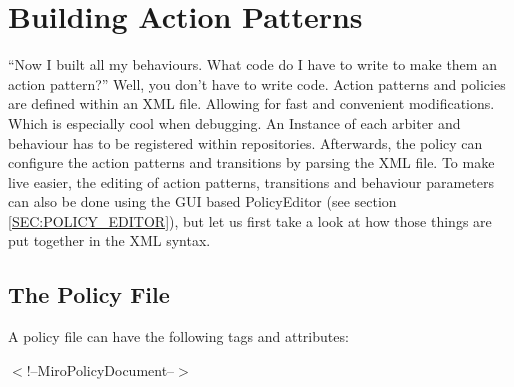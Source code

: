 \section{Building Action Patterns}

``Now I built all my behaviours. What code do I have to write to make
them an action pattern?'' Well, you don't have to write code. Action
patterns and policies are defined within an XML file. Allowing for
fast and convenient modifications. Which is especially cool when
debugging. An Instance of each arbiter and behaviour has to be
registered within repositories. Afterwards, the policy can configure
the action patterns and transitions by parsing the XML file. 
To make live easier, the editing of action patterns, transitions and
behaviour parameters can also be done using the GUI based PolicyEditor
(see section \ref{SEC:POLICY_EDITOR}), but
let us first take a look at how those things are put together in the
XML syntax.

\subsection{The Policy File}

A policy file can have the following tags and attributes:

$<$!--MiroPolicyDocument--$>$

